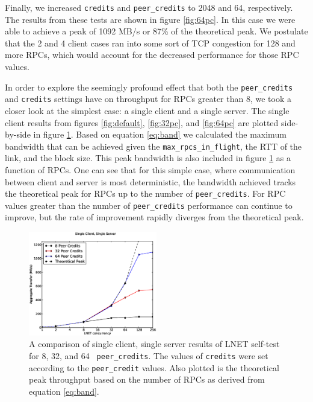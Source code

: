 \documentclass[]{sig-alternate}
\begin{document}
Finally, we increased {\tt credits} and {\tt peer\_credits} to 2048 and 64, respectively. The results from
these tests are shown in figure \ref{fig:64pc}. In this case we were able to achieve a peak of 1092 MB/s or
87\% of the theoretical peak. We postulate that the 2 and 4 client cases ran into some sort of TCP congestion for
128 and more RPCs, which would account for the decreased performance for those RPC values.

In order to explore the seemingly profound effect that both the {\tt peer\_credits} and {\tt credits} settings
have on throughput for RPCs greater than 8, we took a closer look at the simplest case: a single client and a
single server. The single client results from figures \ref{fig:default}, \ref{fig:32pc}, and \ref{fig:64pc}
are plotted side-by-side in figure \ref{fig:singleserver}. Based on equation \ref{eq:band} we calculated the
maximum bandwidth that can be achieved given the {\tt max\_rpcs\_in\_flight}, the RTT of the link, and the
block size.  This peak bandwidth is also included in figure \ref{fig:singleserver} as a function of RPCs. One
can see that for this simple case, where communication between client and server is most deterministic, the
bandwidth achieved tracks the theoretical peak for RPCs up to the number of {\tt peer\_credits}. For RPC
values greater than the number of {\tt peer\_credits} performance can continue to improve, but the rate of
improvement rapidly diverges from the theoretical peak.

\begin{figure}
\centering
\includegraphics[width=0.50\textwidth]{figures/ss_plot.eps}
\caption{A comparison of single client, single server results of LNET self-test for 8, 32, and 64 {\tt
    peer\_credits}. The values of {\tt credits} were set according to the {\tt peer\_credit} values. Also
  plotted is the theoretical peak throughput based on the number of RPCs as derived from equation \ref{eq:band}.}
\label{fig:singleserver}
\end{figure}
\end{document}
